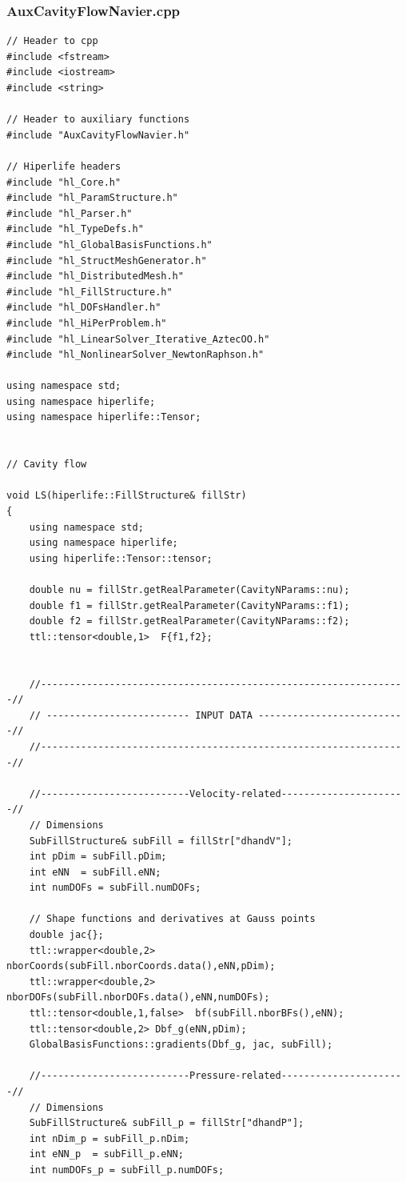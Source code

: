 \documentclass[]{article}
\begin{document}
\subsubsection{AuxCavityFlowNavier.cpp} \label{sec: a.cpp}
\begin{lstlisting}
// Header to cpp
#include <fstream>
#include <iostream>
#include <string>

// Header to auxiliary functions
#include "AuxCavityFlowNavier.h"

// Hiperlife headers
#include "hl_Core.h"
#include "hl_ParamStructure.h"
#include "hl_Parser.h"
#include "hl_TypeDefs.h"
#include "hl_GlobalBasisFunctions.h"
#include "hl_StructMeshGenerator.h"
#include "hl_DistributedMesh.h"
#include "hl_FillStructure.h"
#include "hl_DOFsHandler.h"
#include "hl_HiPerProblem.h"
#include "hl_LinearSolver_Iterative_AztecOO.h"
#include "hl_NonlinearSolver_NewtonRaphson.h"

using namespace std;
using namespace hiperlife;
using namespace hiperlife::Tensor;


// Cavity flow

void LS(hiperlife::FillStructure& fillStr)
{
	using namespace std;
	using namespace hiperlife;
	using hiperlife::Tensor::tensor;
	
	double nu = fillStr.getRealParameter(CavityNParams::nu);
	double f1 = fillStr.getRealParameter(CavityNParams::f1);
	double f2 = fillStr.getRealParameter(CavityNParams::f2);
	ttl::tensor<double,1>  F{f1,f2};
	
	
	//----------------------------------------------------------------//
	// ------------------------- INPUT DATA --------------------------//
	//----------------------------------------------------------------//
	
	//--------------------------Velocity-related----------------------//
	// Dimensions
	SubFillStructure& subFill = fillStr["dhandV"];
	int pDim = subFill.pDim;
	int eNN  = subFill.eNN;
	int numDOFs = subFill.numDOFs;
	
	// Shape functions and derivatives at Gauss points
	double jac{};
	ttl::wrapper<double,2> nborCoords(subFill.nborCoords.data(),eNN,pDim);
	ttl::wrapper<double,2> nborDOFs(subFill.nborDOFs.data(),eNN,numDOFs);
	ttl::tensor<double,1,false>  bf(subFill.nborBFs(),eNN);
	ttl::tensor<double,2> Dbf_g(eNN,pDim);
	GlobalBasisFunctions::gradients(Dbf_g, jac, subFill);
	
	//--------------------------Pressure-related----------------------//
	// Dimensions
	SubFillStructure& subFill_p = fillStr["dhandP"];
	int nDim_p = subFill_p.nDim;
	int eNN_p  = subFill_p.eNN;
	int numDOFs_p = subFill_p.numDOFs;
	

\end{lstlisting}
\end{document}
